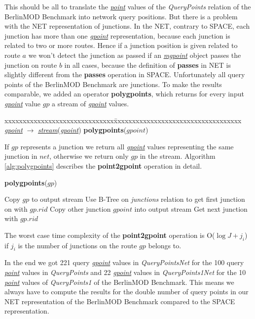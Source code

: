 \documentclass[a4paper]{article}
\newcommand{\bmodb} {BerlinMOD Benchmark}
\newcommand{\op}[1]{\textbf{#1}}
\newcommand{\dt}[1]{\textsl{\underline{#1}}}
\begin{document}
This should be all to translate the \dt{point} values of the \textit{QueryPoints}
relation of the \bmodb{} into network query positions. But there is a problem
with the NET representation of junctions. In the NET, contrary to SPACE, each
junction has more than one \dt{gpoint} representation, because each junction is
related to two or more routes. Hence if a junction position is given related to
route $a$ we won't detect the junction as passed if an \dt{mgpoint} object passes
the junction on route $b$ in all cases, because the definition of \op{passes} in
NET is slightly different from the \op{passes} operation in
SPACE. Unfortunately all query points of the \bmodb{} are junctions. To
make the results comparable, we added an operator \op{polygpoints}, which returns for
every input \dt{gpoint} value $gp$ a stream of \dt{gpoint} values.
\begin{tabbing}
xxxxxxxxxxxxxxxxxxxxxxxxxxxxxx\=xxxxxxxxxxxxxxxxxxxxxxxxxxxxxxxxxxx\kill
\dt{gpoint} $\rightarrow$ \dt{stream}(\dt{gpoint}) \>
\op{polygpoints}($gpoint$)\\
\end{tabbing}
If $gp$ represents a junction
we return all \dt{gpoint} values representing the same junction in $net$,
otherwise we return only $gp$ in the stream. Algorithm \ref{alg:polygpoints}
describes the \op{point2gpoint} operation in detail.
\begin{algorithm}[H]
  \caption{\op{polygpoints}($gp$)}
  \label{alg:polygpoints}
  \begin{algorithmic}[1]
    \STATE Copy $gp$ to output stream
    \STATE Use B-Tree on \textit{junctions} relation to get first junction on with $gp.rid$
        \STATE Copy other junction $gpoint$ into output stream
      \ENDIF
      \STATE Get next junction with $gp.rid$
    \ENDWHILE
  \end{algorithmic}
\end{algorithm}
The worst case time complexity of the \op{point2gpoint} operation is
O($\log J + j_i$) if $j_i$ is the number of junctions on the route $gp$ belongs to.

In the end we got 221 query \dt{gpoint} values in \textit{QueryPointsNet} for the 100
query \dt{point} values in \textit{QueryPoints} and 22 \dt{gpoint} values in
\textit{QueryPoints1Net} for the 10 \dt{point} values of \textit{QueryPoints1} of the
\bmodb{}. This means we always have to compute the results for the double number
of query points in our NET representation of the \bmodb{} compared to the SPACE
representation.
\end{document}
